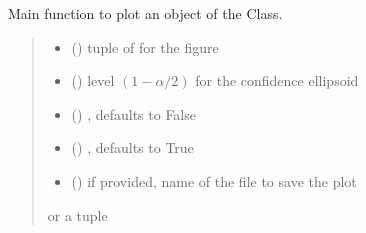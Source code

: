 \documentclass[letterpaper,10pt,english]{sphinxmanual}
\begin{document}
\begin{fulllineitems}
\begin{fulllineitems}
\label{\detokenize{cubmods:cubmods.cube.CUBresCUBE.plot}}
\pysigstartsignatures
{}
\pysigstopsignatures
\sphinxAtStartPar
Main function to plot an object of the Class.
\begin{quote}\begin{description}
\begin{itemize}
\item {} 
\sphinxAtStartPar
{} () \textendash{} tuple of  for the figure

\item {} 
\sphinxAtStartPar
{} () \textendash{} level \((1-\alpha/2)\) for the confidence ellipsoid

\item {} 
\sphinxAtStartPar
{} () \textendash{} , defaults to False

\item {} 
\sphinxAtStartPar
{} () \textendash{} , defaults to True

\item {} 
\sphinxAtStartPar
{} () \textendash{} if provided, name of the file to save the plot

\end{itemize}

\sphinxAtStartPar
{} or a tuple 


\end{description}
\end{quote}
\end{fulllineitems}
\end{fulllineitems}
\end{document}
